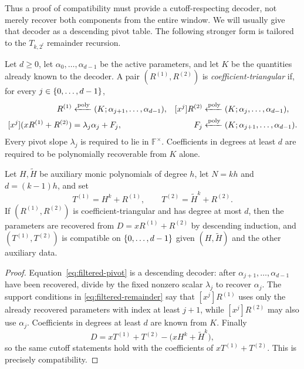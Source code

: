 Thus a proof of compatibility must provide a cutoff-respecting decoder, not
merely recover both components from the entire window.  We will usually give
that decoder as a descending pivot table.  The following stronger form is
tailored to the $T_{k,2^l}$ remainder recursion.

\begin{definition}
\label{def:coefficient-triangular}
Let $d\ge0$, let $\alpha_0,\ldots,\alpha_{d-1}$ be the active parameters, and
let $K$ be the quantities already known to the decoder.  A pair
$(R^{(1)},R^{(2)})$ is \emph{coefficient-triangular} if, for every
$j\in\{0,\dotsc,d-1\}$,
\begin{align}
 [x^j]R^{(1)}
   &\polyfrom (K;\alpha_{j+1},\ldots,\alpha_{d-1}),&
 [x^j]R^{(2)}
   &\polyfrom (K;\alpha_j,\ldots,\alpha_{d-1}),
   \label{eq:filtered-remainder}\\
 [x^j](xR^{(1)}+R^{(2)})
   &=\lambda_j\alpha_j+F_j,
   &F_j&\polyfrom (K;\alpha_{j+1},\ldots,\alpha_{d-1}).
   \label{eq:filtered-pivot}
\end{align}
Every pivot slope $\lambda_j$ is required to lie in $\mathbb F^\times$.
Coefficients in degrees at least $d$ are required to be polynomially
recoverable from $K$ alone.
\end{definition}

\begin{lemma}
\label{lem:triangular-implies-compatible}
Let $H,\widetilde H$ be auxiliary monic polynomials of degree $h$, let
$N=kh$ and $d=(k-1)h$, and set
\[
 T^{(1)}=H^k+R^{(1)},\qquad
 T^{(2)}=\widetilde H^k+R^{(2)}.
\]
If $(R^{(1)},R^{(2)})$ is coefficient-triangular and has degree at most $d$,
then the parameters are recovered from
$D=xR^{(1)}+R^{(2)}$ by descending induction, and
$(T^{(1)},T^{(2)})$ is compatible on $\{0,\dotsc,d-1\}$ given
$(H,\widetilde H)$ and the other auxiliary data.
\end{lemma}
\begin{proof}
Equation~\eqref{eq:filtered-pivot} is a descending decoder: after
$\alpha_{j+1},\ldots,\alpha_{d-1}$ have been recovered, divide by the fixed
nonzero scalar $\lambda_j$ to recover $\alpha_j$.  The support conditions in
\eqref{eq:filtered-remainder} say that $[x^j]R^{(1)}$ uses only the already
recovered parameters with index at least $j+1$, while $[x^j]R^{(2)}$ may also
use $\alpha_j$.  Coefficients in degrees at least $d$ are known from $K$.
Finally
\[
 D=xT^{(1)}+T^{(2)}-\bigl(xH^k+\widetilde H^k\bigr),
\]
so the same cutoff statements hold with the coefficients of
$xT^{(1)}+T^{(2)}$.  This is precisely compatibility.
\end{proof}

